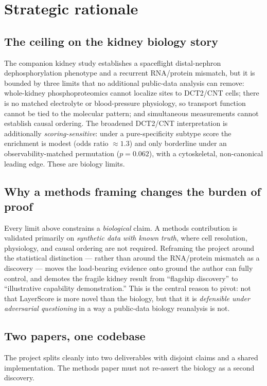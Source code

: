 \documentclass[11pt]{article}
\begin{document}
\section{Strategic rationale}

\subsection{The ceiling on the kidney biology story}
The companion kidney study establishes a spaceflight distal-nephron dephosphorylation phenotype and a
recurrent RNA/protein mismatch, but it is bounded by three limits that no additional public-data analysis
can remove: whole-kidney phosphoproteomics cannot localize sites to DCT2/CNT cells; there is no matched
electrolyte or blood-pressure physiology, so transport function cannot be tied to the molecular pattern;
and simultaneous measurements cannot establish causal ordering. The broadened DCT2/CNT interpretation is
additionally \emph{scoring-sensitive}: under a pure-specificity subtype score the enrichment is modest
(odds ratio ${\approx}1.3$) and only borderline under an observability-matched permutation
($p=0.062$), with a cytoskeletal, non-canonical leading edge. These are biology limits.

\subsection{Why a methods framing changes the burden of proof}
Every limit above constrains a \emph{biological} claim. A methods contribution is validated primarily on
\emph{synthetic data with known truth}, where cell resolution, physiology, and causal ordering are not
required. Reframing the project around the statistical distinction --- rather than around the RNA/protein
mismatch as a discovery --- moves the load-bearing evidence onto ground the author can fully control, and
demotes the fragile kidney result from ``flagship discovery'' to ``illustrative capability demonstration.''
This is the central reason to pivot: not that LayerScore is more novel than the biology, but that it is
\emph{defensible under adversarial questioning} in a way a public-data biology reanalysis is not.

\subsection{Two papers, one codebase}
The project splits cleanly into two deliverables with disjoint claims and a shared implementation. The
methods paper must not re-assert the biology as a second discovery.
\end{document}
